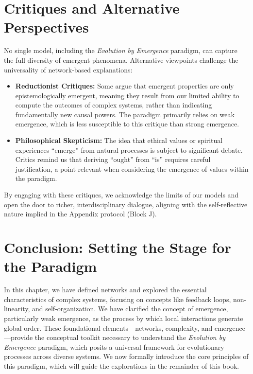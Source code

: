 \documentclass[12pt,openany]{book}
\begin{document}
\section*{Critiques and Alternative Perspectives}
No single model, including the \emph{Evolution by Emergence} paradigm, can capture the full diversity of emergent phenomena. Alternative viewpoints challenge the universality of network-based explanations:
\begin{itemize}
    \item \textbf{Reductionist Critiques:} Some argue that emergent properties are only epistemologically emergent, meaning they result from our limited ability to compute the outcomes of complex systems, rather than indicating fundamentally new causal powers. The paradigm primarily relies on weak emergence, which is less susceptible to this critique than strong emergence.
    \item \textbf{Philosophical Skepticism:} The idea that ethical values or spiritual experiences ``emerge'' from natural processes is subject to significant debate. Critics remind us that deriving ``ought'' from ``is'' requires careful justification, a point relevant when considering the emergence of values within the paradigm.
\end{itemize}
By engaging with these critiques, we acknowledge the limits of our models and open the door to richer, interdisciplinary dialogue, aligning with the self-reflective nature implied in the Appendix protocol (Block J). %

\section*{Conclusion: Setting the Stage for the Paradigm} %
In this chapter, we have defined networks and explored the essential characteristics of complex systems, focusing on concepts like feedback loops, non-linearity, and self-organization. We have clarified the concept of emergence, particularly weak emergence, as the process by which local interactions generate global order. These foundational elements—networks, complexity, and emergence—provide the conceptual toolkit necessary to understand the \emph{Evolution by Emergence} paradigm, which posits a universal framework for evolutionary processes across diverse systems. We now formally introduce the core principles of this paradigm, which will guide the explorations in the remainder of this book. %

\end{document}
